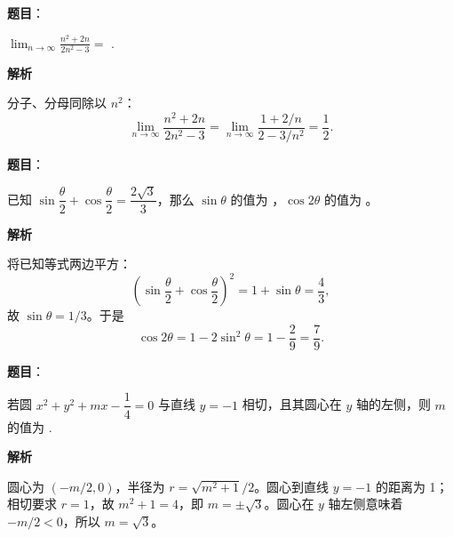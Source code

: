 \begin{answer}

\textbf{题目}：

$\displaystyle\lim_{n\to\infty}\frac{n^2+2n}{2n^2-3}=$ \gkblank{}.

\textbf{解析}

分子、分母同除以 $n^2$：
\nopagebreak[4]
\[\lim_{n\to\infty}\frac{n^2+2n}{2n^2-3}=\lim_{n\to\infty}\frac{1+2/n}{2-3/n^2}=\frac12.\]


\end{answer}
\begin{answer}

\textbf{题目}：

已知 $\sin\dfrac\theta2+\cos\dfrac\theta2=\dfrac{2\sqrt3}{3}$，那么 $\sin\theta$ 的值为 \gkblank{}，$\cos2\theta$ 的值为 \gkblank{}。

\textbf{解析}

将已知等式两边平方：
\nopagebreak[4]
\[\left(\sin\frac\theta2+\cos\frac\theta2\right)^2=1+\sin\theta=\frac43,\]
故 $\sin\theta=1/3$。于是
\nopagebreak[4]
\[\cos2\theta=1-2\sin^2\theta=1-\frac29=\frac79.\]


\end{answer}
\begin{answer}

\textbf{题目}：

若圆 $x^2+y^2+mx-\dfrac14=0$ 与直线 $y=-1$ 相切，且其圆心在 $y$ 轴的左侧，则 $m$ 的值为 \gkblank{}.

\textbf{解析}

圆心为 $(-m/2,0)$，半径为 $r=\sqrt{m^2+1}/2$。圆心到直线 $y=-1$ 的距离为 1；相切要求 $r=1$，故 $m^2+1=4$，即 $m=\pm\sqrt3$。圆心在 $y$ 轴左侧意味着 $-m/2<0$，所以 $m=\sqrt3$。


\end{answer}

